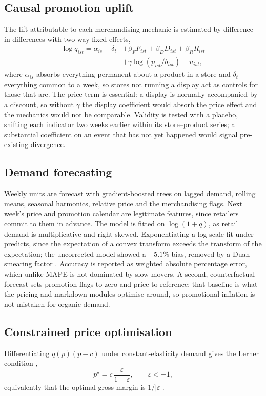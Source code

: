 \documentclass[conference,a4paper]{IEEEtran}
\begin{document}
\subsection{Causal promotion uplift}
The lift attributable to each merchandising mechanic is estimated by
difference-in-differences with two-way fixed effects,
\begin{equation}
\begin{split}
\log q_{ist} = \alpha_{is} + \delta_t
 &+ \beta_F F_{ist} + \beta_D D_{ist} + \beta_R R_{ist}\\
 &+ \gamma \log\!\left(p_{ist}/b_{ist}\right) + u_{ist},
\end{split}
\label{eq:did}
\end{equation}
where $\alpha_{is}$ absorbs everything permanent about a product in a store and
$\delta_t$ everything common to a week, so stores not running a display act as
controls for those that are. The price term is essential: a display is normally
accompanied by a discount, so without $\gamma$ the display coefficient would
absorb the price effect and the mechanics would not be comparable. Validity is
tested with a placebo, shifting each indicator two weeks earlier within its
store--product series; a substantial coefficient on an event that has not yet
happened would signal pre-existing divergence.

\subsection{Demand forecasting}
Weekly units are forecast with gradient-boosted trees on lagged demand, rolling
means, seasonal harmonics, relative price and the merchandising flags. Next week's
price and promotion calendar are legitimate features, since retailers commit to
them in advance. The model is fitted on $\log(1+q)$, as retail demand is
multiplicative and right-skewed. Exponentiating a log-scale fit under-predicts,
since the expectation of a convex transform exceeds the transform of the
expectation; the uncorrected model showed a $-5.1\%$ bias, removed by a Duan
smearing factor \cite{duan1983}. Accuracy is reported as weighted absolute
percentage error, which unlike MAPE is not dominated by slow movers. A second,
counterfactual forecast sets promotion flags to zero and price to reference; that
baseline is what the pricing and markdown modules optimise around, so promotional
inflation is not mistaken for organic demand.

\subsection{Constrained price optimisation}
\label{sec:pricing}
Differentiating $q(p)(p-c)$ under constant-elasticity demand gives the Lerner
condition \cite{lerner1934},
\begin{equation}
p^{\star} = c\,\frac{\varepsilon}{1+\varepsilon},
\qquad \varepsilon < -1,
\label{eq:lerner}
\end{equation}
equivalently that the optimal gross margin is $1/|\varepsilon|$.
\end{document}
